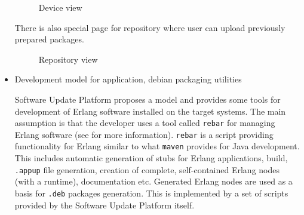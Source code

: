 \begin{itemize}
\begin{figure}[htbp]
  \centering
    \caption{Device view}
\end{figure}

There is also special page for repository where user can upload previously prepared packages.

\begin{figure}[htbp]
  \centering
    \caption{Repository view}
\end{figure}

    \item\label{devmodel} Development model for application, debian packaging utilities

Software Update Platform proposes a model and provides some tools for development of Erlang software installed
on the target systems. The main assumption is that the developer uses a tool called {\tt rebar} for managing Erlang software (see \cite{rebar} for more information).
{\tt rebar} is a script providing functionality for Erlang similar to what {\tt maven} provides for Java development.
This includes automatic generation of stubs for Erlang applications, build, {\tt .appup} file
generation, creation of complete, self-contained Erlang nodes (with a runtime), documentation etc.
Generated Erlang nodes are used as a basis for {\tt .deb} packages generation. This is implemented by a set of
scripts provided by the Software Update Platform itself.

\end{itemize}

